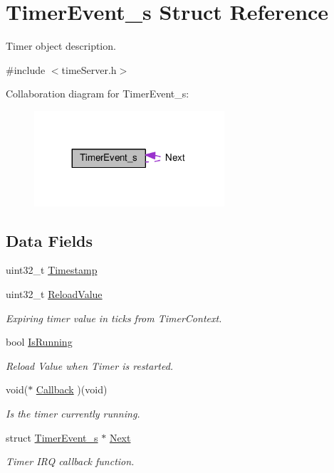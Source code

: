 \hypertarget{structTimerEvent__s}{}\section{Timer\+Event\+\_\+s Struct Reference}
\label{structTimerEvent__s}


Timer object description.  




{\ttfamily \#include $<$time\+Server.\+h$>$}



Collaboration diagram for Timer\+Event\+\_\+s\+:
\nopagebreak
\begin{figure}[H]
\begin{center}
\leavevmode
\includegraphics[width=200pt]{structTimerEvent__s__coll__graph}
\end{center}
\end{figure}
\subsection*{Data Fields}
\begin{DoxyCompactItemize}
\item 
uint32\+\_\+t \hyperlink{structTimerEvent__s_a9f933d63b25c3416b42345b695872c59}{Timestamp}
\item 
uint32\+\_\+t \hyperlink{structTimerEvent__s_a1a2ffdc3bb2cebe3ab97250f6618f5ce}{Reload\+Value}
\begin{DoxyCompactList}\small\item\em Expiring timer value in ticks from Timer\+Context. \end{DoxyCompactList}\item 
bool \hyperlink{structTimerEvent__s_a6dfdcda52c7bc3e408cb590ccbfdbe60}{Is\+Running}
\begin{DoxyCompactList}\small\item\em Reload Value when Timer is restarted. \end{DoxyCompactList}\item 
void($\ast$ \hyperlink{structTimerEvent__s_af9ed72eb732fd7bfc80dc84d289395eb}{Callback} )(void)
\begin{DoxyCompactList}\small\item\em Is the timer currently running. \end{DoxyCompactList}\item 
struct \hyperlink{structTimerEvent__s}{Timer\+Event\+\_\+s} $\ast$ \hyperlink{structTimerEvent__s_a7b5d3c09b4a4b03eff360fd818389d0b}{Next}
\begin{DoxyCompactList}\small\item\em Timer I\+RQ callback function. \end{DoxyCompactList}\end{DoxyCompactItemize}


